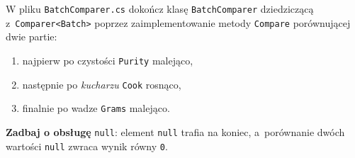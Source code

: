 \documentclass[11pt,a4paper,addpoints]{exam}
\begin{document}
\begin{questions}
\question[1]
W pliku \texttt{BatchComparer.cs} dokończ klasę \texttt{BatchComparer} dziedziczącą z~\texttt{Comparer<Batch>} poprzez zaimplementowanie metody \texttt{Compare} porównującej dwie partie:
\begin{enumerate}
    \item najpierw po czystości \texttt{Purity} malejąco,
    \item następnie po \textit{kucharzu} \texttt{Cook} rosnąco,
    \item finalnie po wadze \texttt{Grams} malejąco.
\end{enumerate}
\textbf{Zadbaj o obsługę} \texttt{null}: element \texttt{null} trafia na koniec, a~porównanie dwóch wartości \texttt{null} zwraca wynik równy \texttt{0}.

\end{questions}
\end{document}
